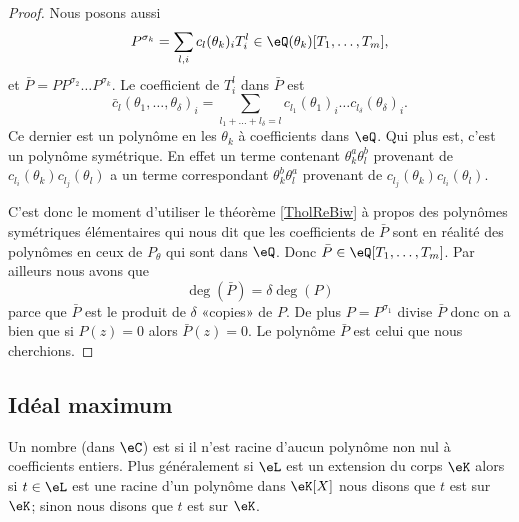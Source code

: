 \begin{proof}
    Nous posons aussi
    \begin{equation}
        P^{\sigma_k}=\sum_{l,i} c_l(\theta_k)_iT_i^l\in \eQ(\theta_k)[T_1,\ldots, T_m],
    \end{equation}
    et \( \bar P=PP^{\sigma_2}\ldots P^{\sigma_k}\). Le coefficient de \( T_i^l\) dans \( \bar P\) est
    \begin{equation}
        \bar c_l(\theta_1,\ldots, \theta_{\delta})_i=\sum_{l_1+\ldots +l_{\delta}=l}c_{l_1}(\theta_1)_i\ldots c_{l_{\delta}}(\theta_{\delta})_i.
    \end{equation}
    Ce dernier est un polynôme en les \( \theta_k\) à coefficients dans \( \eQ\). Qui plus est, c'est un polynôme symétrique. En effet un terme contenant \( \theta_k^a\theta_l^b\) provenant de \( c_{l_i}(\theta_k)c_{l_j}(\theta_l)\) a un terme correspondant \( \theta_k^b\theta_l^a\) provenant de \( c_{l_j}(\theta_k)c_{l_i}(\theta_l)\).

    C'est donc le moment d'utiliser le théorème \ref{TholReBiw} à propos des polynômes symétriques élémentaires qui nous dit que les coefficients de \( \bar P\) sont en réalité des polynômes en ceux de \( P_{\theta}\) qui sont dans \( \eQ\). Donc \( \bar P\in \eQ[T_1,\ldots, T_m]\). Par ailleurs nous avons que
    \begin{equation}
        \deg(\bar P)=\delta \deg(P)
    \end{equation}
    parce que \( \bar P\) est le produit de \( \delta\) «copies»  de \( P\). De plus \( P=P^{\sigma_1}\) divise \( \bar P \) donc on a bien que si \( P(z)=0\) alors \( \bar P(z)=0\). Le polynôme \( \bar P\) est celui que nous cherchions. 
    
\end{proof}

\subsection{Idéal maximum}

\begin{definition}
    Un nombre (dans \( \eC\)) est  si il n'est racine d'aucun polynôme non nul à coefficients entiers. Plus généralement si \( \eL\) est un extension du corps \( \eK\) alors si \( t\in \eL\) est une racine d'un polynôme dans \( \eK[X]\) nous disons que \( t\) est  sur \( \eK\); sinon nous disons que \( t\) est  sur \( \eK\).
\end{definition}

